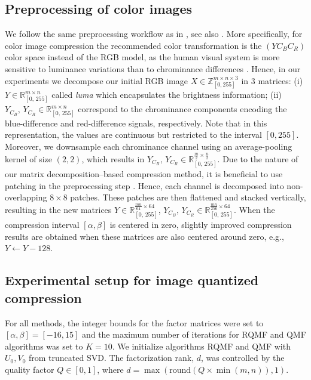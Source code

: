 \documentclass[lettersize,journal]{IEEEtran}
\begin{document}
\subsection{Preprocessing of color images}
\noindent We follow the same preprocessing workflow as in \cite{qmf}, see also \cite{golpayegani2024patchsvd}. More specifically, for color image compression the recommended color transformation is the $(Y C_B C_R)$ color space instead of the RGB model, as the human visual system is more sensitive to luminance variations than to chrominance differences \cite{wallace1991jpeg, netravali1995digital}. Hence, in our experiments we decompose our initial RGB image $X \in \mathbb{Z}_{[0, 255]}^{m \times n \times 3} $ in 3 matrices: (i) $Y \in \mathbb{R}_{[0,\, 255]}^{m \times n}$ called \textit{luma} which encapsulates the brightness information; (ii) $Y_{C_B},\, Y_{C_R} \in \mathbb{R}_{[0,\, 255]}^{m \times n}$ correspond to the chrominance components encoding the blue-difference and red-difference signals, respectively. Note that in this representation, the values are continuous but restricted to the interval $[0, 255]$. Moreover, we downsample each chrominance channel using an average-pooling kernel of size $(2, 2)$, which results in  $Y_{C_B},\, Y_{C_R} \in \mathbb{R}_{[0,\, 255]}^{\frac{m}{2} \times \frac{n}{2}}$. Due to the nature of our matrix decomposition–based compression method, it is beneficial to use  patching in the preprocessing step \cite{qmf, golpayegani2024patchsvd}. Hence, each channel is decomposed into non-overlapping $8\times 8$ patches.  These patches are then flattened and stacked vertically,  resulting in the new matrices $Y \in \mathbb{R}_{[0,\, 255]}^{\frac{mn}{64} \times 64 }$, $ Y_{C_B},\, Y_{C_R} \in \mathbb{R}_{[0,\, 255]}^{\frac{mn}{256} \times 64}$. When the compression interval $[\alpha, \beta]$ is centered in zero, slightly improved compression results are obtained when these matrices are also centered around zero, e.g., $Y \leftarrow Y - 128$.




\subsection{Experimental setup for image quantized compression}
\noindent For all methods, the integer bounds for the factor matrices were set to $[\alpha, \beta] = [-16, 15]$ and the maximum number of iterations for RQMF and QMF algorithms was set to $K = 10$. We initialize algorithms RQMF and QMF with $U_0, V_0$ from truncated SVD.   The factorization rank, $d$, was controlled by the quality factor $Q \in [0, 1]$, where $d = \max(\text{round}(Q \times \min(m, n)), 1)$. \\
\end{document}
